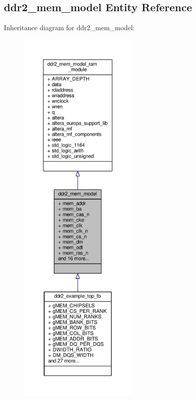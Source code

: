 \subsection{ddr2\+\_\+mem\+\_\+model Entity Reference}
\label{classddr2__mem__model}


Inheritance diagram for ddr2\+\_\+mem\+\_\+model\+:\nopagebreak
\begin{figure}[H]
\begin{center}
\leavevmode
\includegraphics[height=550pt]{de/d94/classddr2__mem__model__inherit__graph}
\end{center}
\end{figure}


